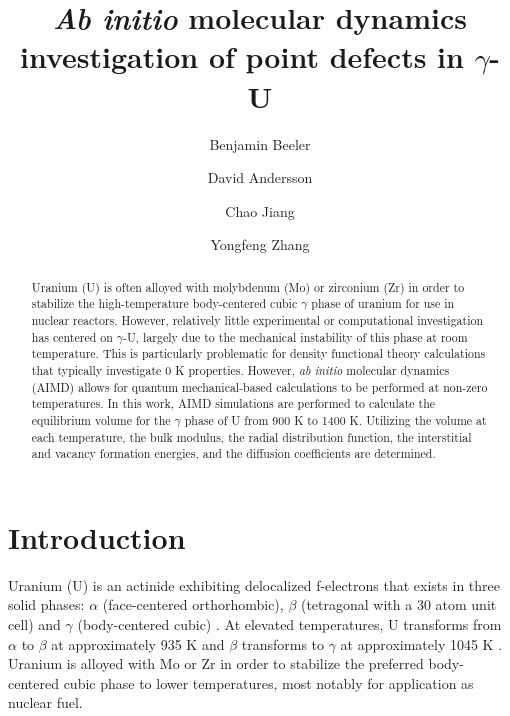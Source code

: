 \documentclass[review]{elsarticle}
\begin{document}
\begin{frontmatter}
\title{\textit{Ab initio} molecular dynamics investigation of point defects in $\gamma$-U}

\author[ncsu,inl]{Benjamin Beeler}
\author[lanl]{David Andersson}
\author[inl]{Chao Jiang}
\author[wisc,inl]{Yongfeng Zhang}
\address[ncsu]{North Carolina State University, Raleigh, NC 27607}
\address[inl]{Idaho National Laboratory, Idaho Falls, ID 83415}
\address[lanl]{Los Alamos National Laboratory, Los Alamos, NM 87545}
\address[wisc]{University of Wisconsin-Madison, Madison, WI 53706}

\begin{abstract}

Uranium (U) is often alloyed with molybdenum (Mo) or zirconium (Zr) in order to stabilize the high-temperature body-centered cubic $\gamma$ phase of uranium for use in nuclear reactors. However, relatively little experimental or computational investigation has centered on $\gamma$-U, largely due to the mechanical instability of this phase at room temperature. This is particularly problematic for density functional theory calculations that typically investigate 0 K properties. However, \textit{ab initio} molecular dynamics (AIMD) allows for quantum mechanical-based calculations to be performed at non-zero temperatures. In this work, AIMD simulations are performed to calculate the equilibrium volume for the $\gamma$ phase of U from 900 K to 1400 K. Utilizing the volume at each temperature, the bulk modulus, the radial distribution function, the interstitial and vacancy formation energies, and the diffusion coefficients are determined. 

\end{abstract}
\end{frontmatter}

\section{Introduction}

Uranium (U) is an actinide exhibiting delocalized f-electrons that exists in three solid phases: $\alpha$ (face-centered orthorhombic), $\beta$ (tetragonal with a 30 atom unit cell) and $\gamma$ (body-centered cubic) \cite{yoo1998}. At elevated temperatures, U transforms from $\alpha$ to $\beta$ at approximately 935 K and $\beta$ transforms to $\gamma$ at approximately 1045 K \cite{soderlind1998}. Uranium is alloyed with Mo or Zr in order to stabilize the preferred body-centered cubic phase to lower temperatures, most notably for application as nuclear fuel. 
\end{document}
